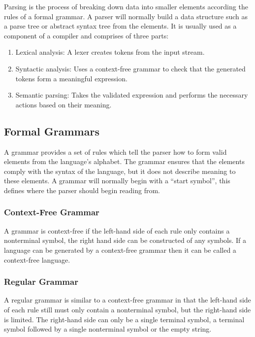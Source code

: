 \documentclass[draft]{report}
\begin{document}
Parsing is the process of breaking down data into smaller elements according the rules of a formal grammar. A parser will normally build a data structure such as a parse tree or abstract syntax tree from the elements. It is usually used as a component of a compiler and comprises of three parts: 

\begin{enumerate}
\item Lexical analysis: A lexer creates tokens from the input stream.

\item Syntactic analysis: Uses a context-free grammar to check that the generated tokens form a meaningful expression.

\item Semantic parsing: Takes the validated expression and performs the necessary actions based on their meaning.
\end{enumerate}

\subsection{Formal Grammars}

A grammar provides a set of rules which tell the parser how to form valid elements from the language's alphabet. The grammar ensures that the elements comply with the syntax of the language, but it does not describe meaning to these elements. A grammar will normally begin with a ``start symbol'', this defines where the parser should begin reading from.

\subsubsection{Context-Free Grammar}

A grammar is context-free if the left-hand side of each rule only contains a nonterminal symbol, the right hand side can be constructed of any symbols. If a language can be generated by a context-free grammar then it can be called a context-free language.

\subsubsection{Regular Grammar}

A regular grammar is similar to a context-free grammar in that the left-hand side of each rule still must only contain a nonterminal symbol, but the right-hand side is limited. The right-hand side can only be a single terminal symbol, a terminal symbol followed by a single nonterminal symbol or the empty string.
\end{document}
